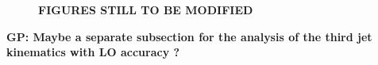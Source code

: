 \begin{figure}[hbt]
\caption{{\bf FIGURES STILL TO BE MODIFIED} } \label{fig:mjjdyjj_1d_3}
\end{figure}

{\bf GP: Maybe a separate subsection for the analysis of the third jet kinematics with LO accuracy ?}

